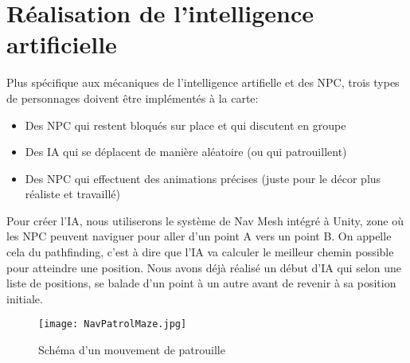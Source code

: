 \documentclass[../doc.tex]{subfiles}
\begin{document}
\section{Réalisation de l'intelligence artificielle}
Plus spécifique aux mécaniques de l'intelligence artifielle et des NPC,
 trois types de personnages doivent être implémentés à la carte:
\begin{itemize}
    \item Des NPC qui restent bloqués sur place et qui discutent en groupe
    \item Des IA qui se déplacent de manière aléatoire (ou qui patrouillent)
    \item Des NPC qui effectuent des animations précises
        (juste pour le décor plus réaliste et travaillé)
\end{itemize}

Pour créer l'IA, nous utiliserons le système de Nav Mesh intégré à Unity, zone où les NPC peuvent naviguer pour aller d'un point A vers un point B.
On appelle cela du pathfinding, c'est à dire que l'IA va calculer le meilleur chemin possible pour atteindre une position.
Nous avons déjà réalisé un début d'IA qui selon une liste de positions, se balade d'un point à un autre avant de revenir à sa position initiale.

\begin{figure}[h]
    \centering
    \texttt{[image: NavPatrolMaze.jpg]}
    \caption{Schéma d'un mouvement de patrouille}
\end{figure}
\end{document}
